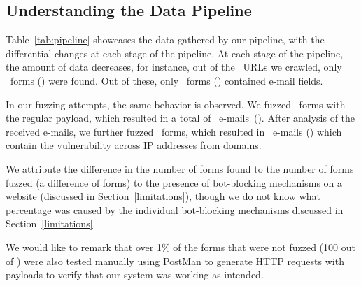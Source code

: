 \subsection[The Pipeline]{Understanding the Data Pipeline}
Table~\ref{tab:pipeline} showcases the data gathered by our pipeline, with the differential changes at each stage of the pipeline. At each stage of the pipeline, the amount of data decreases, for instance, out of the \urls\ URLs we crawled, only \forms\ forms (\formsDelta) were found. Out of these, only \emailforms\ forms (\emailformsDelta) contained e-mail fields.

In our fuzzing attempts, the same behavior is observed. We fuzzed \fuzzed\ forms with the regular payload, which resulted in a total of \recd\ e-mails~(\recdDelta). After analysis of the received e-mails, we further fuzzed \malfuzzed\ forms, which resulted in \success\ e-mails (\successDelta) which contain the vulnerability across \ips IP addresses from \domains domains.

We attribute the difference in the number of forms found to the number of forms fuzzed (a difference of \diffFoundFuzz forms) to the presence of bot-blocking mechanisms on a website (discussed in Section~\ref{limitations}), though we do not know what percentage was caused by the individual bot-blocking mechanisms discussed in Section~\ref{limitations}. 

We would like to remark that over 1\% of the forms that were not fuzzed (100 out of \diffFoundFuzz) were also tested manually using PostMan to generate HTTP requests with payloads to verify that our system was working as intended.





